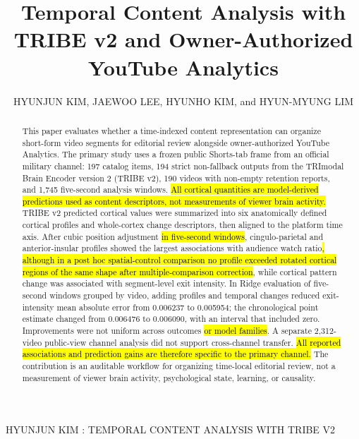 \documentclass{ieeeaccess}
\newcommand{\rev}[1]{\hl{#1}}
\newcommand{\rev}[1]{#1}
\begin{document}

\title{Temporal Content Analysis with TRIBE v2 and Owner-Authorized YouTube Analytics}
\doi{}

\author{\uppercase{HYUNJUN KIM}, \uppercase{JAEWOO LEE}, \uppercase{HYUNHO KIM}, and \uppercase{HYUN-MYUNG LIM}}
\address[1]{Korea Military Academy, Seoul 01805, Republic of Korea (e-mail: kimhyuh@kma.ac.kr; onlybyhim@kma.ac.kr)}
\address[2]{Korea Advanced Institute of Science and Technology (KAIST), Daejeon, Republic of Korea (e-mail: hyunjun1121@kaist.ac.kr)}
\address[3]{CHA University, Seongnam, Republic of Korea (e-mail: simonlee98@chauniv.ac.kr)}

{HYUNJUN KIM \headeretal: TEMPORAL CONTENT ANALYSIS WITH TRIBE V2}


\begin{abstract}
This paper evaluates whether a time-indexed content representation can organize short-form video segments for editorial review alongside owner-authorized YouTube Analytics. The primary study uses a frozen public Shorts-tab frame from an official military channel: 197 catalog items, 194 strict non-fallback outputs from the TRImodal Brain Encoder version 2 (TRIBE v2), 190 videos with non-empty retention reports, and 1,745 five-second analysis windows. \rev{All cortical quantities are model-derived predictions used as content descriptors, not measurements of viewer brain activity.} TRIBE v2 predicted cortical values were summarized into six anatomically defined cortical profiles and whole-cortex change descriptors, then aligned to the platform time axis. After cubic position adjustment\rev{ in five-second windows}, cingulo-parietal and anterior-insular profiles showed the largest associations with audience watch ratio\rev{, although in a post hoc spatial-control comparison no profile exceeded rotated cortical regions of the same shape after multiple-comparison correction}, while cortical pattern change was associated with segment-level exit intensity. In Ridge evaluation of five-second windows grouped by video, adding profiles and temporal changes reduced exit-intensity mean absolute error from 0.006237 to 0.005954; the chronological point estimate changed from 0.006476 to 0.006090, with an interval that included zero. Improvements were not uniform across outcomes\rev{ or model families}. A separate 2,312-video public-view channel analysis did not support cross-channel transfer. \rev{All reported associations and prediction gains are therefore specific to the primary channel.} The contribution is an auditable workflow for organizing time-local editorial review, not a measurement of viewer brain activity, psychological state, learning, or causality.
\end{abstract}
\end{document}
